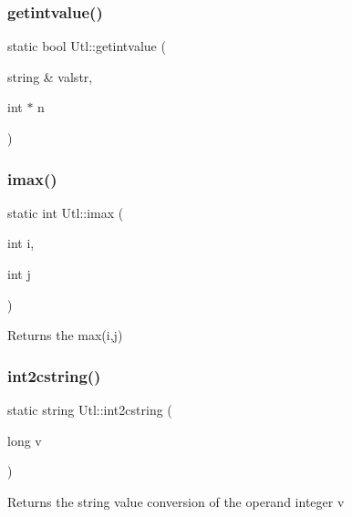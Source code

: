 \subsubsection{\texorpdfstring{getintvalue()}{getintvalue()}}
{\footnotesize\ttfamily static bool Utl\+::getintvalue (\begin{DoxyParamCaption}\item[{string \&}]{valstr,  }\item[{int $\ast$}]{n }\end{DoxyParamCaption})\hspace{0.3cm}{\ttfamily [static]}}

\mbox{\label{classUtl_aa824770fa334f72507116fff411c42a2}} 
\subsubsection{\texorpdfstring{imax()}{imax()}}
{\footnotesize\ttfamily static int Utl\+::imax (\begin{DoxyParamCaption}\item[{int}]{i,  }\item[{int}]{j }\end{DoxyParamCaption})\hspace{0.3cm}{\ttfamily [static]}}

\begin{DoxyReturn}{Returns}
the max(i,j) 
\end{DoxyReturn}
\mbox{\label{classUtl_abfe3696af92966cdba0868beea93f741}} 
\subsubsection{\texorpdfstring{int2cstring()}{int2cstring()}}
{\footnotesize\ttfamily static string Utl\+::int2cstring (\begin{DoxyParamCaption}\item[{long}]{v }\end{DoxyParamCaption})\hspace{0.3cm}{\ttfamily [static]}}

\begin{DoxyReturn}{Returns}
the string value conversion of the operand integer v 
\end{DoxyReturn}
\mbox{\label{classUtl_a938efe90aa7bac25352e23841e77ca28}} 
